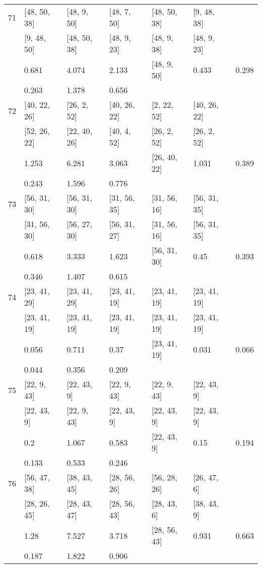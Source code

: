 \begin{longtable}{| l || l | l | l | l | l | l | }
\hline
71  & [48, 50, 38] & [48, 9, 50] & [48, 7, 50] & [48, 50, 38] & [9, 48, 38] \\
 & [9, 48, 50] & [48, 50, 38] & [48, 9, 23] & [48, 9, 38] & [48, 9, 23]\\
\hline
& 0.681 & 4.074 & 2.133 & [48, 9, 50] & 0.433 & 0.298\\
\hline
& 0.263 & 1.378 & 0.656 \\
\hline

\hline
72  & [40, 22, 26] & [26, 2, 52] & [40, 26, 22] & [2, 22, 52] & [40, 26, 22] \\
 & [52, 26, 22] & [22, 40, 26] & [40, 4, 52] & [26, 2, 52] & [26, 2, 52]\\
\hline
& 1.253 & 6.281 & 3.063 & [26, 40, 22] & 1.031 & 0.389\\
\hline
& 0.243 & 1.596 & 0.776 \\
\hline

\hline
73  & [56, 31, 30] & [56, 31, 30] & [31, 56, 35] & [31, 56, 16] & [56, 31, 35] \\
 & [31, 56, 30] & [56, 27, 30] & [56, 31, 27] & [31, 56, 16] & [56, 31, 35]\\
\hline
& 0.618 & 3.333 & 1.623 & [56, 31, 30] & 0.45 & 0.393\\
\hline
& 0.346 & 1.407 & 0.615 \\
\hline

\hline
74  & [23, 41, 29] & [23, 41, 29] & [23, 41, 19] & [23, 41, 19] & [23, 41, 19] \\
 & [23, 41, 19] & [23, 41, 19] & [23, 41, 19] & [23, 41, 19] & [23, 41, 19]\\
\hline
& 0.056 & 0.711 & 0.37 & [23, 41, 19] & 0.031 & 0.066\\
\hline
& 0.044 & 0.356 & 0.209 \\
\hline

\hline
75  & [22, 9, 43] & [22, 43, 9] & [22, 9, 43] & [22, 9, 43] & [22, 43, 9] \\
 & [22, 43, 9] & [22, 9, 43] & [22, 43, 9] & [22, 43, 9] & [22, 43, 9]\\
\hline
& 0.2 & 1.067 & 0.583 & [22, 43, 9] & 0.15 & 0.194\\
\hline
& 0.133 & 0.533 & 0.246 \\
\hline

\hline
76  & [56, 47, 38] & [38, 43, 45] & [28, 56, 26] & [56, 28, 26] & [26, 47, 6] \\
 & [28, 26, 45] & [28, 43, 47] & [28, 56, 43] & [28, 43, 6] & [38, 43, 9]\\
\hline
& 1.28 & 7.527 & 3.718 & [28, 56, 43] & 0.931 & 0.663\\
\hline
& 0.187 & 1.822 & 0.906 \\
\hline


\end{longtable}
